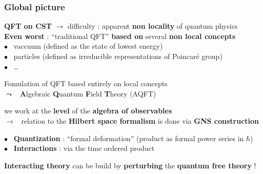 \documentclass[9pt]{beamer}
\begin{document}
\begin{frame}

\frametitle{Global picture}

\vfill

\textdbend \quad \textbf{QFT on CST} $\to$ difficulty : apparent \textbf{non locality} of quantum physics \  \\

\textbf{Even worst} : ``traditional QFT'' \textbf{based on} several \textbf{non local concepts} \\

\quad $\bullet$ \ vaccuum (defined as the state of lowest energy) \\
\quad $\bullet$ \ particles (defined as irreducible representations of Poincaré group) \\
\quad $\bullet$ \ \dots \\

\vspace*{-12pt}

\begin{block}{\vspace*{-3ex}}
\vspace*{-10pt}
\begin{center}
Fomulation of QFT based entirely on local concepts \\
$\leadsto$ \ \textbf{A}lgebraic \textbf{Q}uantum \textbf{F}ield \textbf{T}heory (AQFT) \\
\end{center}
\vspace*{-7pt}
\end{block}

\vfill

we work at the \textbf{level} of the \textbf{algebra of observables} \\
$\to$ \ relation to the \textbf{Hilbert space formalism} is done via \textbf{GNS construction} \\

\vfill

$\bullet$ \ \textbf{Quantization} : ``formal deformation'' (product as formal power series in $\hbar$) \\ 

$\bullet$ \ \textbf{Interactions} : via the time ordered product

\vspace*{-12pt}

\begin{block}{\vspace*{-3ex}}
\vspace*{-10pt}
\begin{center}
\textbf{Interacting theory} can be build by \textbf{perturbing} the \textbf{quantum free theory} !
\end{center}
\vspace*{-7pt}
\end{block}

\vfill

\end{frame}
\end{document}
